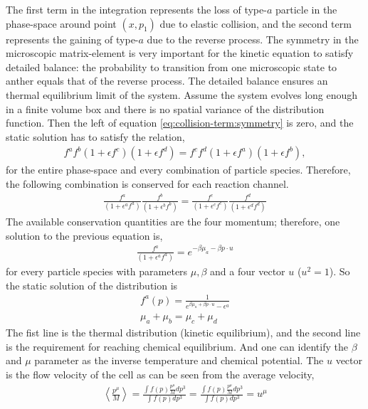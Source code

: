 The first term in the integration represents the loss of type-$a$ particle in the phase-space around point $(x, p_1)$ due to elastic collision, and the second term represents the gaining of type-$a$ due to the reverse process.
The symmetry in the microscopic matrix-element is very important for the kinetic equation to satisfy detailed balance: the probability to transition from one microscopic state to anther equals  that of the reverse process.
The detailed balance ensures an thermal equilibrium limit of the system. 
Assume the system evolves long enough in a finite volume box and there is no spatial variance of the distribution function.
Then the left of equation \ref{eq:collision-term:symmetry} is zero, and the static solution has to satisfy the relation,
\begin{eqnarray}
f^a f^b (1+\epsilon f^c) (1+\epsilon f^d) = f^c f^d (1+\epsilon f^a) (1+\epsilon f^b),
\end{eqnarray}
for the entire phase-space and every combination of particle species.
Therefore, the following combination is conserved for each reaction channel.
 \begin{eqnarray}
\frac{f^a}{(1+\epsilon^a f^a)} \frac{f^b}{(1+\epsilon^b f^b)}
= \frac{f^c}{(1+\epsilon^c f^c)} \frac{f^d}{(1+\epsilon^d f^d)}
\end{eqnarray}
The available conservation quantities are the four momentum; therefore, one solution to the previous equation is,
\begin{eqnarray}
\frac{f^a}{(1+\epsilon^a f^a)} = e^{-\beta \mu_a-\beta p\cdot u}
\end{eqnarray}
for every particle species with parameters $\mu, \beta$ and a four vector $u$ ($u^2 = 1$). 
So the static solution of the distribution is 
\begin{eqnarray}
f^a(p) = \frac{1}{ e^{\beta \mu_a+\beta p\cdot u} - \epsilon^a} \label{eq:thermal}\\
\mu_a +\mu_b = \mu_c + \mu_d \label{eq:chem}
\end{eqnarray}
The fist line is the thermal distribution (kinetic equilibrium), and the second line is the requirement for reaching chemical equilibrium. 
And one can identify the $\beta$ and $\mu$ parameter as the inverse temperature and chemical potential. The $u$ vector is the flow velocity of the cell as can be seen from the average velocity,
\begin{eqnarray}
\left\langle \frac{p^\mu}{M} \right\rangle = \frac{\int f(p) \frac{p^\mu}{M} dp^3}{\int f(p) dp^3} = \frac{\int f(p) \frac{p^\mu}{M} dp^3}{\int f(p) dp^3} = u^\mu
\end{eqnarray}

